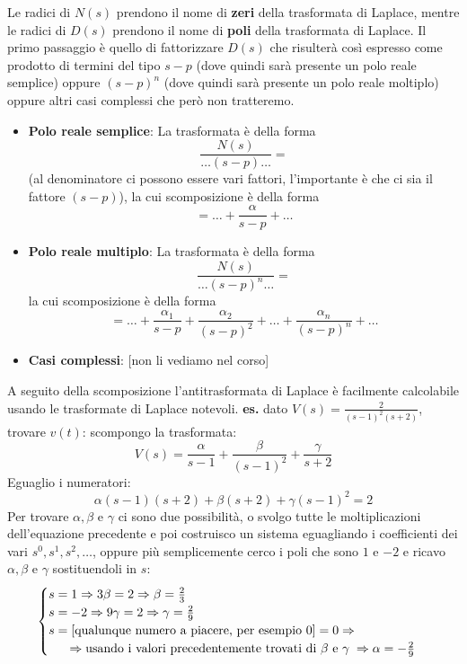 \newline
Le radici di $N(s)$ prendono il nome di \textbf{zeri} della trasformata di Laplace, mentre le radici di $D(s)$ prendono il nome di \textbf{poli} della trasformata di Laplace.\newline
\newline
Il primo passaggio è quello di fattorizzare $D(s)$ che risulterà così espresso come prodotto di termini del tipo $s-p$ (dove quindi sarà presente un polo reale semplice) oppure $(s-p)^n$ (dove quindi sarà presente un polo reale moltiplo) oppure altri casi complessi che però non tratteremo.
\begin{itemize}
    \item \textbf{Polo reale semplice}:\newline
    La trasformata è della forma 
    \[
        \frac{N(s)}{\dots(s-p)\dots} =
    \]
    (al denominatore ci possono essere vari fattori, l'importante è che ci sia il fattore $(s-p)$), la cui scomposizione è della forma
    \[
        = \dots + \frac{\alpha}{s-p} + \dots
    \]
    \item \textbf{Polo reale multiplo}:\newline
    La trasformata è della forma
    \[
        \frac{N(s)}{\dots (s-p)^n \dots} =
    \]
    la cui scomposizione è della forma
    \[
        = \dots + \frac{\alpha_1}{s-p} + \frac{\alpha_2}{(s-p)^2} + \dots + \frac{\alpha_n}{(s-p)^n} + \dots
    \]
    \item \textbf{Casi complessi}: [non li vediamo nel corso]
\end{itemize}
A seguito della scomposizione l'antitrasformata di Laplace è facilmente calcolabile usando le trasformate di Laplace notevoli.
\newline
\newline
\newline
\textbf{es.} dato $V(s) = \frac{2}{(s-1)^2(s+2)}$, trovare $v(t)$:
scompongo la trasformata:
\[
    V(s) = \frac{\alpha}{s-1} + \frac{\beta}{(s-1)^2} + \frac{\gamma}{s+2}
\]
Eguaglio i numeratori:
\[
    \alpha(s-1)(s+2) + \beta(s+2) + \gamma(s-1)^2 = 2
\]
Per trovare $\alpha, \beta$ e $\gamma$ ci sono due possibilità, o svolgo tutte le moltiplicazioni dell'equazione precedente e poi costruisco un sistema eguagliando i coefficienti dei vari $s^0, s^1, s^2, \dots$, oppure più semplicemente cerco i poli che sono $1$ e $-2$ e ricavo $\alpha, \beta$ e $\gamma$ sostituendoli in $s$:
\[
    \begin{cases}
        s=1 \Rightarrow 3 \beta = 2 \Rightarrow \beta = \frac{2}{3}\\
        s=-2 \Rightarrow 9 \gamma = 2 \Rightarrow \gamma = \frac{2}{9}\\
        s=[\text{qualunque numero a piacere, per esempio 0}] = 0 \Rightarrow \\
        \text{\;\;\;\;\;} \Rightarrow \text{usando i valori precedentemente trovati di $\beta$ e $\gamma$}\; \Rightarrow \alpha=-\frac{2}{9} 
    \end{cases}
\] 
